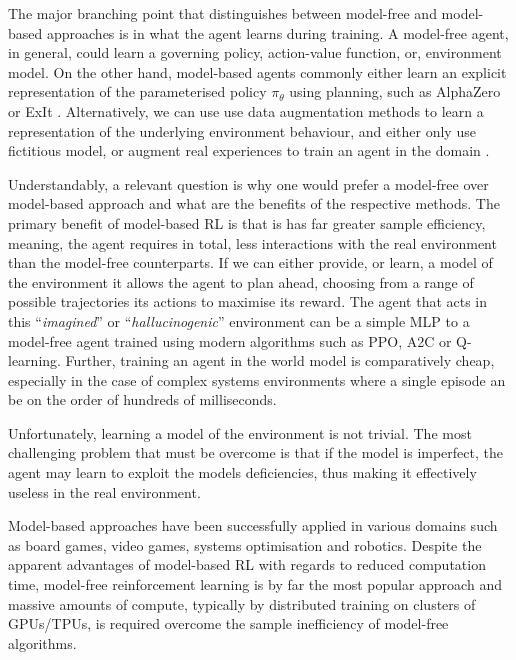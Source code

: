 The major branching point that distinguishes between model-free and model-based approaches is in what the agent learns during training. A model-free agent, in general, could learn a governing policy, action-value function, or, environment model. On the other hand, model-based agents commonly either learn an explicit representation of the parameterised policy $\pi_\theta$ using planning, such as AlphaZero \cite{silver2017mastering} or ExIt \cite{anthony2017thinking}. Alternatively, we can use use data augmentation methods to learn a representation of the underlying environment behaviour, and either only use fictitious model, or augment real experiences to train an agent in the domain \cite{kaiser2020modelbased, feinberg2018modelbased, freeman2019learning}.

Understandably, a relevant question is why one would prefer a model-free over model-based approach and what are the benefits of the respective methods. The primary benefit of model-based RL is that is has far greater sample efficiency, meaning, the agent requires in total, less interactions with the real environment than the model-free counterparts. If we can either provide, or learn, a model of the environment it allows the agent to plan ahead, choosing from a range of possible trajectories its actions to maximise its reward. The agent that acts in this ``\textit{imagined}'' or ``\textit{hallucinogenic}'' environment can be a simple MLP \cite{ha2018worldmodels} to a model-free agent trained using modern algorithms such as PPO, A2C or Q-learning. Further, training an agent in the world model is comparatively cheap, especially in the case of complex systems environments where a single episode an be on the order of hundreds of milliseconds.

Unfortunately, learning a model of the environment is not trivial. The most challenging problem that must be overcome is that if the model is imperfect, the agent may learn to exploit the models deficiencies, thus making it effectively useless in the real environment.

Model-based approaches have been successfully applied in various domains such as board games, video games, systems optimisation and robotics. Despite the apparent advantages of model-based RL with regards to reduced computation time, model-free reinforcement learning is by far the most popular approach and massive amounts of compute, typically by distributed training on clusters of GPUs/TPUs, is required overcome the sample inefficiency of model-free algorithms.

